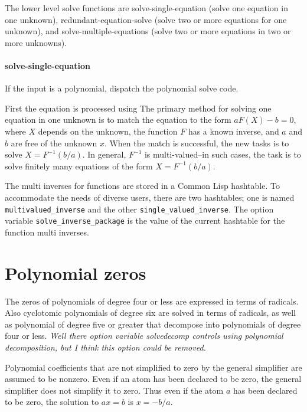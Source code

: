 \documentclass[]{article}%
\newcommand{\multivaluedinverse}{\texttt{multivalued\_inverse}}
\newcommand{\singlevaluedinverse}{\texttt{single\_valued\_inverse}}
\newcommand{\solveinversepackage}{\texttt{solve\_inverse\_package}}
\begin{document}
The lower level solve functions are solve-single-equation (solve one equation in one unknown), redundant-equation-solve (solve two or more equations for one unknown), and solve-multiple-equations (solve two or more equations in two or more unknowns).

\paragraph{solve-single-equation} If the input is a polynomial, dispatch the polynomial solve code.

First the equation is processed using
The primary method for solving one equation in one unknown is to match the equation to the form \(a F(X) - b = 0\), where \(X\) depends on the unknown, the function \(F\) has a known inverse, and \(a\) and \(b\) are free of the unknown \(x\). When the match is successful, the new tasks is to solve \(X = F^{-1}(b/a) \). In general, \(F^{-1}\) is multi-valued--in such cases, the task is to solve finitely many equations of the form  \(X = F^{-1}(b/a) \).

The multi inverses for functions are stored in a Common Lisp hashtable. To accommodate the needs of diverse users,
there are two hashtables; one is named \multivaluedinverse\/ and the other \singlevaluedinverse.  The option
variable \solveinversepackage\/ is the value of the current hashtable for the function multi inverses.

\section{Polynomial zeros}

The zeros of polynomials of degree four or less are expressed in terms of radicals. Also  cyclotomic polynomials of degree six are solved in terms of radicals, as well as polynomial of degree five or greater that decompose into polynomials of degree four or less. \emph{Well there option variable solvedecomp controls using polynomial decomposition, but I think this option could be removed.}

\begin{alphalist}[noitemsep]

\item  Polynomial coefficients that are not simplified to zero by the  general simplifier are assumed to be nonzero. Even if an atom has been declared to be zero, the general simplifier does not simplify  it to zero. Thus even if the atom \(a\) has been declared to be zero, the solution to \(a x = b\) is \(x = -b/a \).



\end{alphalist}
\end{document}
